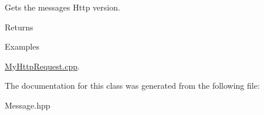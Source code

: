 Gets the message\textquotesingle{}s Http version. 

\begin{DoxyReturn}{Returns}

\begin{DoxyCode}{0}
\DoxyCodeLine{\textcolor{stringliteral}{"HTTP/major.minor"} }
\end{DoxyCode}
 
\end{DoxyReturn}
\begin{Desc}
\item[Examples]\par
\mbox{\hyperlink{MyHttpRequest_8cpp-example}{My\+Http\+Request.\+cpp}}.\end{Desc}


The documentation for this class was generated from the following file\+:\begin{DoxyCompactItemize}
\item 
Message.\+hpp\end{DoxyCompactItemize}
